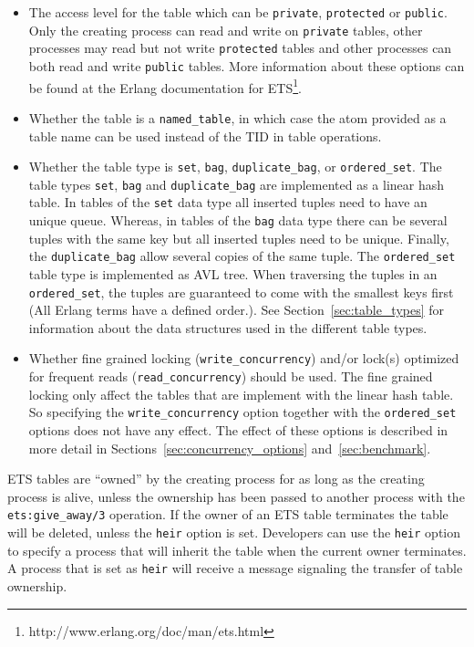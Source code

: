 \documentclass[aps,pre,preprint,nofootinbib]{revtex4}
\begin{document}
\begin{itemize}
\item
  The access level for the table which can be \verb|private|, \verb|protected| or \verb|public|.
  Only the creating process can read and write on \verb|private| tables, other processes may read but not write \verb|protected| tables and other processes can both read and write \verb|public| tables.
  More information about these options can be found at the Erlang documentation for ETS\footnote{http://www.erlang.org/doc/man/ets.html}.
\item
  Whether the table is a \verb|named_table|, in which case the atom provided as a table name can be used instead of the TID in table operations.
\item
  Whether the table type is \verb|set|, \verb|bag|, \verb|duplicate_bag|, or \verb|ordered_set|.
  The table types \verb|set|, \verb|bag| and \verb|duplicate_bag| are implemented as a linear hash table.
  In tables of the \verb|set| data type all inserted tuples need to have an unique queue.
  Whereas, in tables of the \verb|bag| data type there can be several tuples with the same key but all inserted tuples need to be unique.
  Finally, the \verb|duplicate_bag| allow several copies of the same tuple.
  The \verb|ordered_set| table type is implemented as AVL tree.
  When traversing the tuples in an \verb|ordered_set|, the tuples are guaranteed to come with the smallest keys first (All Erlang terms have a defined order.).
  See Section~\ref{sec:table_types} for information about the data structures used in the different table types.
\item
  Whether fine grained locking (\verb|write_concurrency|) and/or lock(s) optimized for frequent reads (\verb|read_concurrency|) should be used.
  The fine grained locking only affect the tables that are implement with the linear hash table.
  So specifying the \verb|write_concurrency| option together with the \verb|ordered_set| options does not have any effect.
  The effect of these options is described in more detail in Sections~\ref{sec:concurrency_options} and~\ref{sec:benchmark}.
\end{itemize}

ETS tables are ``owned'' by the creating process for as long as the creating process is alive, unless the ownership has been passed to another process with the \verb|ets:give_away/3| operation.
If the owner of an ETS table terminates the table will be deleted, unless the \verb|heir| option is set.
Developers can use the \verb|heir| option to specify a process that will inherit the table when the current owner terminates.
A process that is set as \verb|heir| will receive a message signaling the transfer of table ownership.
\end{document}
